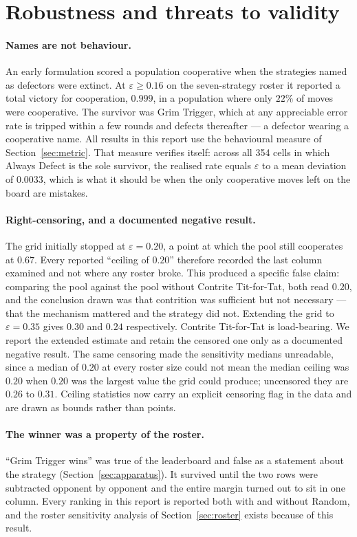 \documentclass[11pt,a4paper]{article}
\newcommand{\eps}{\varepsilon}
\begin{document}
\FloatBarrier
\section{Robustness and threats to validity}
\label{sec:robust}

\paragraph{Names are not behaviour.}
An early formulation scored a population cooperative when the strategies named
as defectors were extinct. At $\eps \geq 0.16$ on the seven-strategy roster it
reported a total victory for cooperation, $0.999$, in a population where only
$22\%$ of moves were cooperative. The survivor was Grim Trigger, which at any
appreciable error rate is tripped within a few rounds and defects thereafter ---
a defector wearing a cooperative name. All results in this report use the
behavioural measure of Section~\ref{sec:metric}. That measure verifies itself:
across all 354 cells in which Always Defect is the sole survivor, the realised
rate equals $\eps$ to a mean deviation of $0.0033$, which is what it should be when
the only cooperative moves left on the board are mistakes.

\paragraph{Right-censoring, and a documented negative result.}
The grid initially stopped at $\eps = 0.20$, a point at which the pool still
cooperates at $0.67$. Every reported ``ceiling of $0.20$'' therefore recorded the
last column examined and not where any roster broke. This produced a specific
false claim: comparing the pool against the pool without Contrite Tit-for-Tat,
both read $0.20$, and the conclusion drawn was that contrition was sufficient
but not necessary --- that the mechanism mattered and the strategy did not.
Extending the grid to $\eps = 0.35$ gives $0.30$ and $0.24$ respectively.
Contrite Tit-for-Tat is load-bearing. We report the extended estimate and retain
the censored one only as a documented negative result. The same censoring made
the sensitivity medians unreadable, since a median of $0.20$ at every roster
size could not mean the median ceiling was $0.20$ when $0.20$ was the largest
value the grid could produce; uncensored they are $0.26$ to $0.31$. Ceiling
statistics now carry an explicit censoring flag in the data and are drawn as
bounds rather than points.

\paragraph{The winner was a property of the roster.}
``Grim Trigger wins'' was true of the leaderboard and false as a statement about
the strategy (Section~\ref{sec:apparatus}). It survived until the two rows were
subtracted opponent by opponent and the entire margin turned out to sit in one
column. Every ranking in this report is reported both with and without Random,
and the roster sensitivity analysis of Section~\ref{sec:roster} exists because of
this result.
\end{document}

